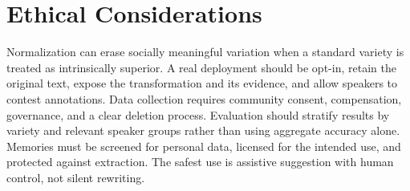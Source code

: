 \section{Ethical Considerations}
\label{sec:ethics}

Normalization can erase socially meaningful variation when a standard variety
is treated as intrinsically superior. A real deployment should be opt-in,
retain the original text, expose the transformation and its evidence, and
allow speakers to contest annotations. Data collection requires community
consent, compensation, governance, and a clear deletion process. Evaluation
should stratify results by variety and relevant speaker groups rather than
using aggregate accuracy alone. Memories must be screened for personal data,
licensed for the intended use, and protected against extraction. The safest
use is assistive suggestion with human control, not silent rewriting.

